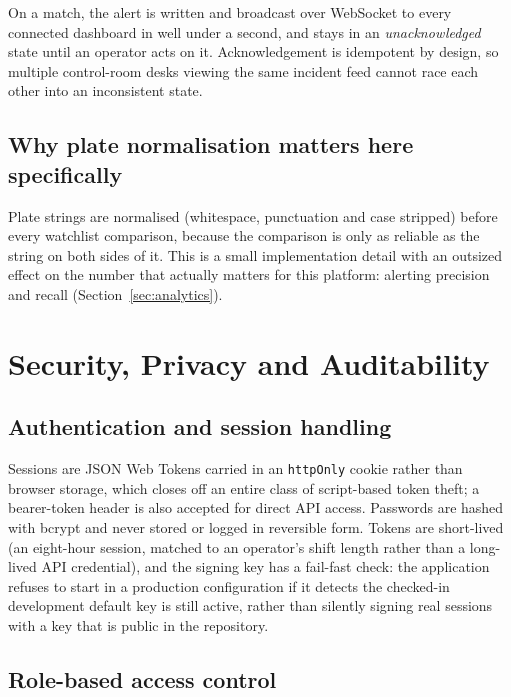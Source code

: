 \documentclass[11pt,a4paper]{article}
\begin{document}
On a match, the alert is written and broadcast over WebSocket to every
connected dashboard in well under a second, and stays in an
\emph{unacknowledged} state until an operator acts on it. Acknowledgement
is idempotent by design, so multiple control-room desks viewing the same
incident feed cannot race each other into an inconsistent state.

\subsection{Why plate normalisation matters here specifically}

Plate strings are normalised (whitespace, punctuation and case stripped)
before every watchlist comparison, because the comparison is only as
reliable as the string on both sides of it. This is a small implementation
detail with an outsized effect on the number that actually matters for
this platform: alerting precision and recall (Section~\ref{sec:analytics}).

\section{Security, Privacy and Auditability}
\label{sec:security}

\subsection{Authentication and session handling}

Sessions are JSON Web Tokens carried in an \texttt{httpOnly} cookie rather
than browser storage, which closes off an entire class of script-based
token theft; a bearer-token header is also accepted for direct API access.
Passwords are hashed with bcrypt and never stored or logged in reversible
form. Tokens are short-lived (an eight-hour session, matched to an
operator's shift length rather than a long-lived API credential), and the
signing key has a fail-fast check: the application refuses to start in a
production configuration if it detects the checked-in development default
key is still active, rather than silently signing real sessions with a key
that is public in the repository.

\subsection{Role-based access control}
\end{document}
